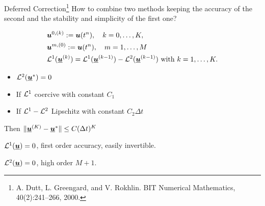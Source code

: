 \documentclass[aspectratio=169]{beamer}
\begin{document}
\begin{frame}{Deferred Correction\footnote{A. Dutt, L. Greengard, and V. Rokhlin. BIT Numerical Mathematics, 40(2):241–266,
			2000.}}
	How to combine two methods keeping the accuracy of the second and the stability and simplicity of the first one?
	
	\begin{minipage}{0.58\textwidth}
		\begin{equation*}\label{DeC_method}
			\begin{split}
				&\boldsymbol{u}^{0,(k)}:=\boldsymbol{u}(t^n), \quad k=0,\dots, K,\\
				&\boldsymbol{u}^{m,(0)}:=\boldsymbol{u}(t^n),\quad m=1,\dots, M\\
				&\mathcal{L}^1(\underline{\boldsymbol{u}}^{(k)})=\mathcal{L}^1(\underline{\boldsymbol{u}}^{(k-1)})-\mathcal{L}^2(\underline{\boldsymbol{u}}^{(k-1)})\text{ with }k=1,\dots,K.
			\end{split}
		\end{equation*}\vspace{-4mm}
\begin{theorem}
	\begin{itemize}
		\item $\mathcal{L}^2(\underline{\boldsymbol{u}}^*)=0$
		\item If $\mathcal{L}^1$ coercive with constant $C_1$
		\item If $\mathcal{L}^1-\mathcal{L}^2$ Lipschitz with constant $C_2 \Delta t$
	\end{itemize}
	Then $\lVert \underline{\boldsymbol{u}}^{(K)}-\underline{\boldsymbol{u}}^*\rVert \leq C(\Delta t)^K$
\end{theorem}
	\end{minipage} \hfill
	\begin{minipage}{0.4\textwidth}
		\begin{itemize}
			{
				\item $\mathcal{L}^1(\underline{\boldsymbol{u}})=0$, first order accuracy, easily invertible.
				\item $\mathcal{L}^2(\underline{\boldsymbol{u}})=0$, high order $M+1$.
			}
		\end{itemize}
	\end{minipage}
	
\end{frame}
\end{document}
